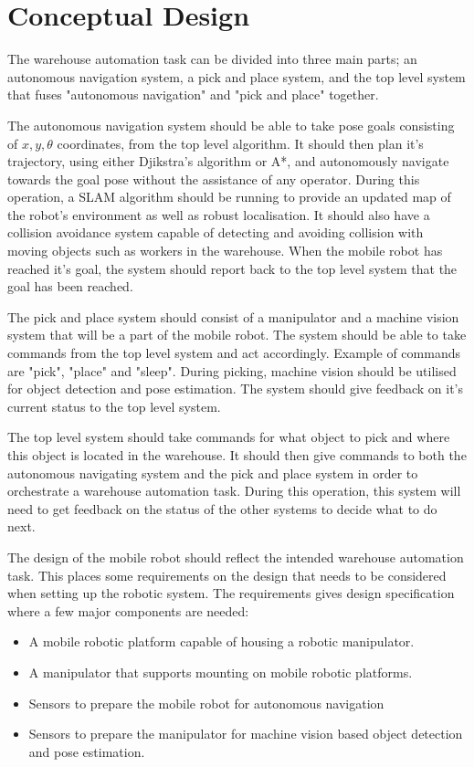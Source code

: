 \section{Conceptual Design}\label{sec:M:ConceptualDesign}
The warehouse automation task can be divided into three main parts; an autonomous navigation system, a pick and place system, and the top level system that fuses "autonomous navigation" and "pick and place" together.

The autonomous navigation system should be able to take pose goals consisting of $x,y,\theta$ coordinates, from the top level algorithm. It should then plan it's trajectory, using either Djikstra's algorithm or A*, and autonomously navigate towards the goal pose without the assistance of any operator. During this operation, a SLAM algorithm should be running to provide an updated map of the robot's environment as well as robust localisation. It should also have a collision avoidance system capable of detecting and avoiding collision with moving objects such as workers in the warehouse. When the mobile robot has reached it's goal, the system should report back to the top level system that the goal has been reached.

The pick and place system should consist of a manipulator and a machine vision system that will be a part of the mobile robot. The system should be able to take commands from the top level system and act accordingly. Example of commands are "pick", "place" and "sleep". During picking, machine vision should be utilised for object detection and pose estimation. The system should give feedback on it's current status to the top level system.

The top level system should take commands for what object to pick and where this object is located in the warehouse. It should then give commands to both the autonomous navigating system and the pick and place system in order to orchestrate a warehouse automation task. During this operation, this system will need to get feedback on the status of the other systems to decide what to do next.

The design of the mobile robot should reflect the intended warehouse automation task. This places some requirements on the design that needs to be considered when setting up the robotic system. The requirements gives design specification where a few major components are needed:

\begin{itemize}
    \item A mobile robotic platform capable of housing a robotic manipulator.
    \item A manipulator that supports mounting on mobile robotic platforms.
    \item Sensors to prepare the mobile robot for autonomous navigation
    \item Sensors to prepare the manipulator for machine vision based object detection and pose estimation.
\end{itemize}

